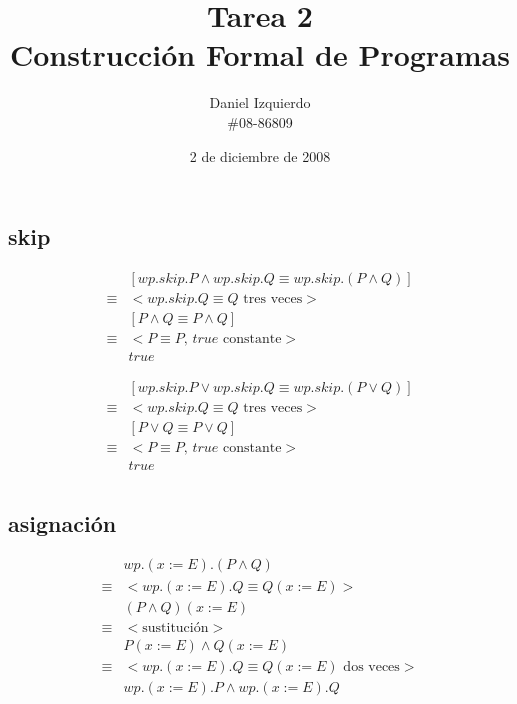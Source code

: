 \documentclass{article}
\begin{document}

\title{Tarea 2 \\ Construcción Formal de Programas}
\author{Daniel Izquierdo \\ \#08-86809}
\date{2 de diciembre de 2008}

\maketitle

\setcounter{section}{-1}

\section{}

\setcounter{subsection}{-1}

\subsection{skip}

\begin{align*}
 & [ wp.skip.P \wedge wp.skip.Q \equiv wp.skip.(P \wedge Q) ] \\
 \equiv & <wp.skip.Q \equiv Q \text{ tres veces}> \\
 & [ P \wedge Q \equiv P \wedge Q ] \\
 \equiv & <P \equiv P \text{, } true \text{ constante}> \\
 & true
\end{align*}

\begin{align*}
 & [ wp.skip.P \vee wp.skip.Q \equiv wp.skip.(P \vee Q) ] \\
 \equiv & <wp.skip.Q \equiv Q \text{ tres veces}> \\
 & [ P \vee Q \equiv P \vee Q ] \\
 \equiv & <P \equiv P \text{, } true \text{ constante}> \\
 & true \\
\end{align*}

\subsection{asignación}

\begin{align*}
 & wp.(x := E).(P \wedge Q) \\
 \equiv & <wp.(x := E).Q \equiv Q(x := E)> \\
 & (P \wedge Q)(x := E) \\
 \equiv & <\text{sustitución}> \\
 & P(x := E) \wedge Q(x := E) \\
 \equiv & <wp.(x := E).Q \equiv Q(x := E) \text{ dos veces}> \\
 & wp.(x := E).P \wedge wp.(x := E).Q \\
\end{align*}
\end{document}

